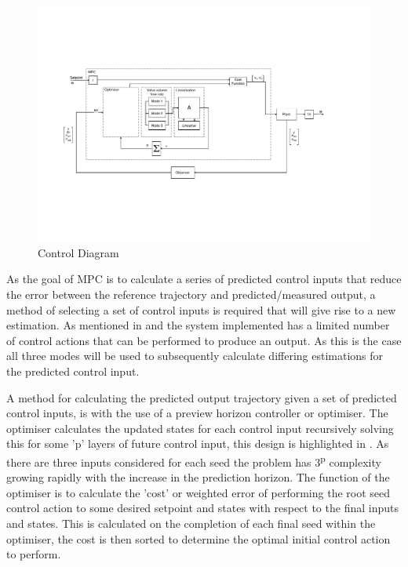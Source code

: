 \documentclass[11pt,a4paper]{article}
\begin{document}
\begin{figure}[!hbt]
    \centering
    \includegraphics[clip, trim=2cm 4cm 4cm 4cm, width=1.00\textwidth]{BlockDiagram_Overview.pdf}
    \caption{Control Diagram}
    \label{fig:control_diagram_overview}
\end{figure}

As the goal of MPC is to calculate a series of predicted control inputs that reduce the error between the reference trajectory and predicted/measured output, a method of selecting a set of control inputs is required that will give rise to a new estimation. As mentioned in  and  the system implemented has a limited number of control actions that can be performed to produce an output. As this is the case all three modes will be used to subsequently calculate differing estimations for the predicted control input. \newline

A method for calculating the predicted output trajectory given a set of predicted control inputs, is with the use of a preview horizon controller or optimiser. The optimiser calculates the updated states for each control input recursively solving this for some 'p' layers of future control input, this design is highlighted in . As there are three inputs considered for each seed the problem has 3\textsuperscript{p} complexity growing rapidly with the increase in the prediction horizon. The function of the optimiser is to calculate the 'cost'  or weighted error of performing the root seed control action to some desired setpoint and states with respect to the final inputs and states. This is calculated on the completion of each final seed within the optimiser, the cost is then sorted to determine the optimal initial control action to perform.
\end{document}
